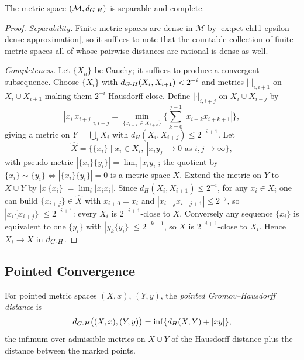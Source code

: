 \begin{proposition}
  \label{prop:pet-ch11-gh-space-separable-complete}
  The metric space $(\mathcal{M},d_{G\text{-}H})$ is separable and complete.
\end{proposition}
\begin{proof}
  \emph{Separability.} Finite metric spaces are dense in $\mathcal{M}$ by
  \cref{ex:pet-ch11-epsilon-dense-approximation}, so it suffices to note that
  the countable collection of finite metric spaces all of whose pairwise
  distances are rational is dense as well.

  \emph{Completeness.} Let $\{X_n\}$ be Cauchy; it suffices to produce a
  convergent subsequence. Choose $\{X_i\}$ with
  $d_{G\text{-}H}(X_i,X_{i+1})<2^{-i}$ and metrics $|\cdot|_{i,i+1}$ on $X_i\cup X_{i+1}$
  making them $2^{-i}$-Hausdorff close. Define $|\cdot|_{i,i+j}$ on
  $X_i\cup X_{i+j}$ by
  \[
    |x_i\,x_{i+j}|_{i,i+j}
    =\min_{\{x_{i+k}\in X_{i+k}\}}\Big\{\sum_{k=0}^{j-1}|x_{i+k}x_{i+k+1}|\Big\},
  \]
  giving a metric on $Y=\bigcup_iX_i$ with $d_H(X_i,X_{i+j})\le2^{-i+1}$. Let
  \[
    \hat X=\big\{\{x_i\}\mid x_i\in X_i,\ |x_iy_j|\to0\text{ as }i,j\to\infty\big\},
  \]
  with pseudo-metric $|\{x_i\}\{y_i\}|=\lim_i|x_iy_i|$; the quotient by
  $\{x_i\}\sim\{y_i\}\iff|\{x_i\}\{y_i\}|=0$ is a metric space $X$. Extend the
  metric on $Y$ to $X\cup Y$ by
  $|x\,\{x_i\}|=\lim_i|x_ix_i|$. Since $d_H(X_i,X_{i+1})\le2^{-i}$, for any
  $x_i\in X_i$ one can build $\{x_{i+j}\}\in\hat X$ with $x_{i+0}=x_i$ and
  $|x_{i+j}x_{i+j+1}|\le2^{-j}$, so $|x_i\{x_{i+j}\}|\le2^{-i+1}$: every
  $X_i$ is $2^{-i+1}$-close to $X$. Conversely any sequence $\{x_i\}$ is
  equivalent to one $\{y_i\}$ with $|y_k\{y_i\}|\le2^{-k+1}$, so $X$ is
  $2^{-i+1}$-close to $X_i$. Hence $X_i\to X$ in $d_{G\text{-}H}$.
\end{proof}

\subsection{Pointed Convergence}

\begin{definition}
  \label{def:pet-ch11-pointed-gh-distance}
  For pointed metric spaces $(X,x)$, $(Y,y)$, the \emph{pointed
  Gromov--Hausdorff distance} is
  \[
    d_{G\text{-}H}\big((X,x),(Y,y)\big)=\inf\{d_H(X,Y)+|xy|\},
  \]
  the infimum over admissible metrics on $X\cup Y$ of the Hausdorff distance
  plus the distance between the marked points.
\end{definition}

